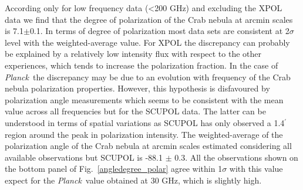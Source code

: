 \documentclass[twocolumn,traditabstract]{aa}
\def\NIKA{\textit{NIKA}}
\def\Planck{\textit{Planck}}
\def\WMAP{\textit{WMAP}}
\begin{document}
According only for low frequency data (\textless 200 GHz) and excluding the XPOL data we find that the degree of polarization of the Crab nebula at arcmin scales is 7.1$\pm$0.1.
In terms of degree of polarization most data sets are consistent at 2$\sigma$ level with the weighted-average value. For XPOL the discrepancy can probably be explained by a relatively low intensity flux with respect to the other experiences, which tends to increase the polarization fraction. In the case of \Planck\ the discrepancy may be due to an evolution with frequency of the Crab nebula polarization properties.
However, this hypothesis is disfavoured by polarization
angle measurements which seems to be consistent with the mean value across all frequencies but for the SCUPOL data. The latter can be understood in terms of spatial variations as SCUPOL has only observed a 1.4$^\prime$ region around the peak in polarization intensity. 
The weighted-average of the polarization angle of the Crab nebula at arcmin scales estimated considering all available observations but SCUPOL is -88.1 $\pm$ 0.3.
All the observations shown on the bottom panel of Fig.~\ref{angledegree_polar} agree within 1$\sigma$ with this value expect for the \Planck\ value obtained at 30 GHz, which is slightly high. 
\end{document}
